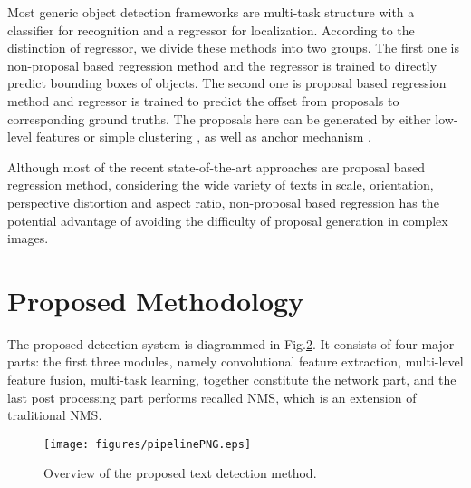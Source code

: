 \documentclass[10pt,twocolumn,letterpaper]{article}
\begin{document}
	Most generic object detection frameworks are multi-task structure with a classifier for recognition and a regressor for localization. 
	According to the distinction of regressor, we divide these methods into two groups. 
	The first one is non-proposal based regression method \cite{overfeat} \cite{yolo} \cite{densebox} and the regressor is trained to directly predict bounding boxes of objects. 
	The second one is proposal based regression method \cite{sppnet} \cite{fast-rcnn} \cite{faster-rcnn} \cite{multibox} \cite{ssd} \cite{gidaris2015object} and regressor is trained to predict the offset from proposals to corresponding ground truths. 
	The proposals here can be generated by either low-level features \cite{uijlings2013selective} \cite{cheng2014bing} \cite{zitnick2014edge} or simple clustering \cite{multibox}, as well as anchor mechanism \cite{faster-rcnn}.
	
	Although most of the recent state-of-the-art approaches are proposal based regression method, considering the wide variety of texts in scale, orientation, perspective distortion and aspect ratio, non-proposal based regression has the potential advantage of avoiding the difficulty of proposal generation in complex images.

\section{Proposed Methodology}
	\label{Sec.3}
	The proposed detection system is diagrammed in Fig.\hyperref[Fig.2]{2}. It consists of four major parts: the first three modules, namely convolutional feature extraction, multi-level feature fusion, multi-task learning, together constitute the network part, and the last post processing part performs recalled NMS, which is an extension of traditional NMS.
	
	\begin{figure*}
		\label{Fig.2}
		\centering
		\texttt{[image: figures/pipelinePNG.eps]}
		\caption{Overview of the proposed text detection method.}
	\end{figure*}
	
\end{document}
